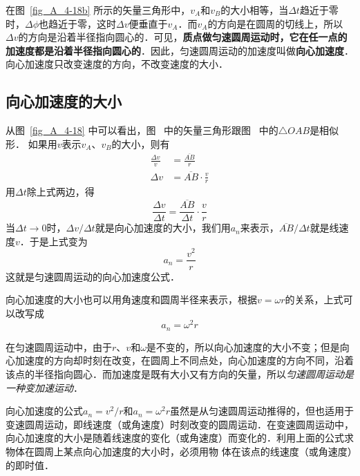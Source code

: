 在图~\ref{fig_A_4-18b} 所示的矢量三角形中，$v_A$和$v_B$的大小相等，当$\Delta t$趋近于零时，$\Delta \phi$也趋近于零，这时$\Delta v$便垂直于$v_A$．而$v_A$的方向是在圆周的切线上，所以$\Delta v$的方向是沿着半径指向圆心的．可见，\textbf{质点做匀速圆周运动时，它在任一点的加速度都是沿着半径指向圆心的}．因此，匀速圆周运动的加速度叫做\textbf{向心加速度}．向心加速度只改变速度的方向，不改变速度的大小．

\subsection{向心加速度的大小} 



从图~\ref{fig_A_4-18} 中可以看出，图~ 中的矢量三角形跟图~ 中的$\triangle OAB$是相似形．
如果用$v$表示$v_A$、$v_B$的大小，则有
\[\begin{split}
\frac{\Delta v}{v}&=\frac{\overline{AB}}{r}\\
\Delta v &= \overline{AB}\cdot \frac{v}{r}
\end{split} \]
用$\Delta t$除上式两边，得
\[\frac{\Delta v}{\Delta t}=\frac{\overline{AB}}{\Delta t}\cdot \frac{v}{r} \]
当$\Delta t\to 0$时，$\Delta v/\Delta t$就是向心加速度的大小，我们用$a_n$来表示，$\overline{AB}/\Delta t$就是线速度$v$．于是上式变为
\[a_n=\frac{v^2}{r} \]
这就是匀速圆周运动的向心加速度公式．

向心加速度的大小也可以用角速度和圆周半径来表示，根据$v=\omega r$的关系，上式可以改写成
\[a_n=\omega^2 r \]

在匀速圆周运动中，由于$r$、$v$和$\omega$是不变的，所以向心加速度的大小不变；但是向心加速度的方向却时刻在改变，在圆周上不同点处，向心加速度的方向不同，沿着该点的半径指向圆心．而加速度是既有大小又有方向的矢量，所以\textit{匀速圆周运动是一种变加速运动}．

向心加速度的公式$a_n=v^2/r$和$a_n=\omega^2 r$虽然是从匀速圆周运动推得的，但也适用于变速圆周运动，即线速度（或角速度）时刻改变的圆周运动．在变速圆周运动中，向心加速度的大小是随着线速度的变化（或角速度）而变化的．利用上面的公式求物体在圆周上某点向心加速度的大小时，必须用物
体在该点的线速度（或角速度）的即时值．

